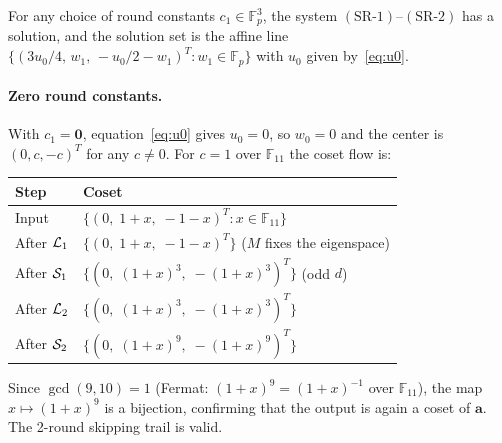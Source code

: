 \documentclass[11pt]{article}
\begin{document}
\begin{proposition}\label{prop:center-exists}
    For any choice of round constants $c_1\in\mathbb{F}_p^3$, the system
    $\mathrm{(SR\text{-}1)}$--$\mathrm{(SR\text{-}2)}$ has a solution, and the
    solution set is the affine line
    $\{(3u_0/4,\,w_1,\,-u_0/2-w_1)^T : w_1\in\mathbb{F}_p\}$
    with $u_0$ given by~\eqref{eq:u0}.
\end{proposition}

\paragraph{Zero round constants.}
With $c_1=\mathbf{0}$, equation~\eqref{eq:u0} gives $u_0=0$, so $w_0=0$ and the
center is $(0,c,-c)^T$ for any $c\neq 0$.  For $c=1$ over $\mathbb{F}_{11}$
the coset flow is:
\begin{center}
\begin{tabular}{ll}
    \hline
    Step & Coset \\
    \hline
    Input & $\{(0,\;1+x,\;-1-x)^T : x\in\mathbb{F}_{11}\}$ \\
    After $\mathcal{L}_1$ & $\{(0,\;1+x,\;-1-x)^T\}$ \quad ($M$ fixes the eigenspace) \\
    After $\mathcal{S}_1$ & $\{(0,\;(1+x)^3,\;-(1+x)^3)^T\}$ \quad (odd $d$) \\
    After $\mathcal{L}_2$ & $\{(0,\;(1+x)^3,\;-(1+x)^3)^T\}$ \\
    After $\mathcal{S}_2$ & $\{(0,\;(1+x)^9,\;-(1+x)^9)^T\}$ \\
    \hline
\end{tabular}
\end{center}
Since $\gcd(9,10)=1$ (Fermat: $(1+x)^9=(1+x)^{-1}$ over $\mathbb{F}_{11}$),
the map $x\mapsto(1+x)^9$ is a bijection, confirming that the output is again
a coset of $\mathbf{a}$.  The 2-round skipping trail is valid.
\end{document}
